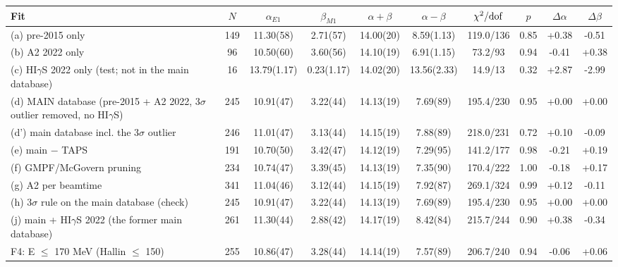 \begin{tabular}{lccccccccc}
\hline
Fit & $N$ & $\alpha_{E1}$ & $\beta_{M1}$ & $\alpha+\beta$ & $\alpha-\beta$ & $\chi^2/{\rm dof}$ & $p$ & $\Delta\alpha$ & $\Delta\beta$ \\
\hline
(a) pre-2015 only & 149 & 11.30(58) & 2.71(57) & 14.00(20) & 8.59(1.13) & 119.0/136 & 0.85 & +0.38 & -0.51 \\
(b) A2 2022 only & 96 & 10.50(60) & 3.60(56) & 14.10(19) & 6.91(1.15) & 73.2/93 & 0.94 & -0.41 & +0.38 \\
(c) HI$\gamma$S 2022 only (test; not in the main database) & 16 & 13.79(1.17) & 0.23(1.17) & 14.02(20) & 13.56(2.33) & 14.9/13 & 0.32 & +2.87 & -2.99 \\
(d) MAIN database (pre-2015 + A2 2022, 3$\sigma$ outlier removed, no HI$\gamma$S) & 245 & 10.91(47) & 3.22(44) & 14.13(19) & 7.69(89) & 195.4/230 & 0.95 & +0.00 & +0.00 \\
(d') main database incl. the 3$\sigma$ outlier & 246 & 11.01(47) & 3.13(44) & 14.15(19) & 7.88(89) & 218.0/231 & 0.72 & +0.10 & -0.09 \\
(e) main $-$ TAPS & 191 & 10.70(50) & 3.42(47) & 14.12(19) & 7.29(95) & 141.2/177 & 0.98 & -0.21 & +0.19 \\
(f) GMPF/McGovern pruning & 234 & 10.74(47) & 3.39(45) & 14.13(19) & 7.35(90) & 170.4/222 & 1.00 & -0.18 & +0.17 \\
(g) A2 per beamtime & 341 & 11.04(46) & 3.12(44) & 14.15(19) & 7.92(87) & 269.1/324 & 0.99 & +0.12 & -0.11 \\
(h) 3$\sigma$ rule on the main database (check) & 245 & 10.91(47) & 3.22(44) & 14.13(19) & 7.69(89) & 195.4/230 & 0.95 & +0.00 & +0.00 \\
(j) main + HI$\gamma$S 2022 (the former main database) & 261 & 11.30(44) & 2.88(42) & 14.17(19) & 8.42(84) & 215.7/244 & 0.90 & +0.38 & -0.34 \\
F4: E $\le$ 170 MeV (Hallin $\le$ 150) & 255 & 10.86(47) & 3.28(44) & 14.14(19) & 7.57(89) & 206.7/240 & 0.94 & -0.06 & +0.06 \\
\hline
\end{tabular}

